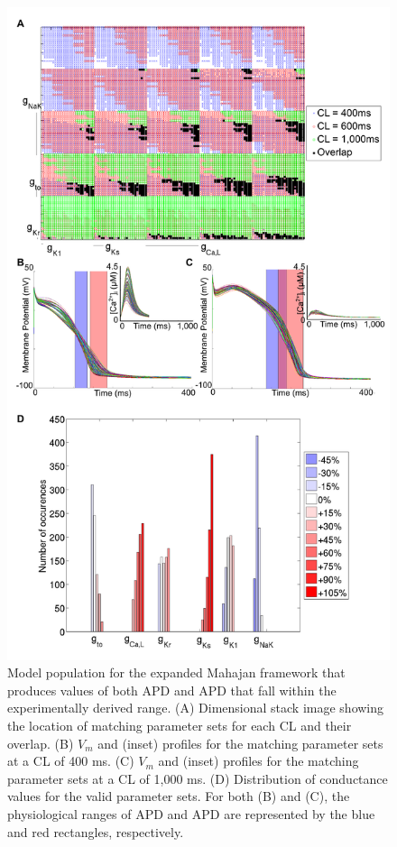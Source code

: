 \documentclass[../thesis-main.tex]{subfiles}
\begin{document}
\begin{figure}
 \centering
 \includegraphics[width=\textwidth]{mahajan-population}
 \caption[Model population for the expanded Mahajan framework that produces values of both APD and APD that fall within the experimentally derived range.]{Model population for the expanded Mahajan framework that produces values of both APD and APD that fall within the experimentally derived range. (A) Dimensional stack image showing the location of matching parameter sets for each CL and their overlap. (B) $V_m$ and \cai{} (inset) profiles for the matching parameter sets at a CL of 400 ms. (C) $V_m$ and \cai{} (inset) profiles for the matching parameter sets at a CL of 1,000 ms. (D) Distribution of conductance values for the valid parameter sets. For both (B) and (C), the physiological ranges of APD and APD are represented by the blue and red rectangles, respectively.}
 \label{fig:mahajan-population}
\end{figure}
\end{document}
